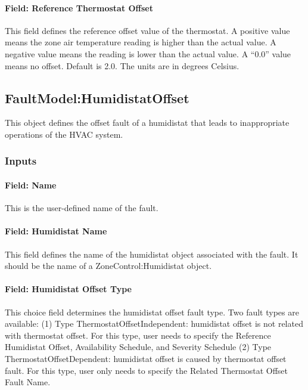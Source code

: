 \paragraph{Field: Reference Thermostat Offset}\label{field-reference-thermostat-offset}

This field defines the reference offset value of the thermostat. A positive value means the zone air temperature reading is higher than the actual value. A negative value means the reading is lower than the actual value. A ``0.0'' value means no offset. Default is 2.0. The units are in degrees Celsius.

\subsection{FaultModel:HumidistatOffset}\label{faultmodelhumidistatoffset}

This object defines the offset fault of a humidistat that leads to inappropriate operations of the HVAC system.

\subsubsection{Inputs}\label{inputs-7-015}

\paragraph{Field: Name}\label{field-name-7-011}

This is the user-defined name of the fault.

\paragraph{Field: Humidistat Name}\label{field-humidistat-name}

This field defines the name of the humidistat object associated with the fault. It should be the name of a ZoneControl:Humidistat object.

\paragraph{Field: Humidistat Offset Type}\label{field-humidistat-offset-type}

This choice field determines the humidistat offset fault type. Two fault types are available: (1) Type ThermostatOffsetIndependent: humidistat offset is not related with thermostat offset. For this type, user needs to specify the Reference Humidistat Offset, Availability Schedule, and Severity Schedule (2) Type ThermostatOffsetDependent: humidistat offset is caused by thermostat offset fault. For this type, user only needs to specify the Related Thermostat Offset Fault Name.

